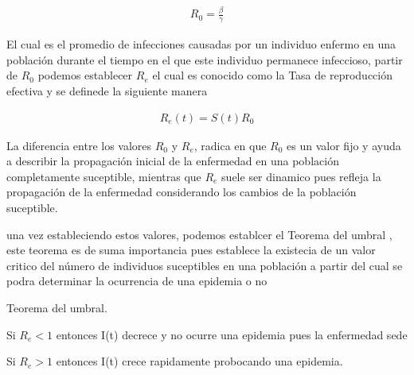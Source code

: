 \begin{align}
R_{0} = \frac{\beta}{\gamma}
\end{align}

El cual es el promedio de infecciones causadas por un individuo enfermo en una población durante el tiempo en el que este individuo permanece infeccioso, partir de $R_{0}$ podemos establecer $R_{e}$ el cual es conocido como la Tasa de reproducción efectiva y se definede la siguiente manera  

\begin{align}
R_{e} (t) = S(t)R_{0} 
\end{align}

La diferencia entre los valores $R_{0}$ y  $R_{e}$, radica en que $R_{0}$ es un valor fijo y ayuda a describir la propagación inicial de la enfermedad en una población completamente suceptible, mientras que $R_{e}$ suele ser dinamico pues refleja la propagación de la enfermedad considerando los cambios de la población suceptible. \cite{Brauer}

una vez estableciendo estos valores, podemos establcer el Teorema del umbral \cite{Foundations}, este teorema es de suma importancia pues establece la existecia de un valor critico del número de individuos suceptibles en una población a partir del cual se podra determinar la ocurrencia de una epidemia o no

\begin{teo}
Teorema del umbral.

Si  $R_{e} < 1$ entonces I(t) decrece y no ocurre una epidemia pues la enfermedad sede 

Si  $R_{e} > 1$ entonces I(t) crece rapidamente probocando una epidemia. 
\end{teo}

